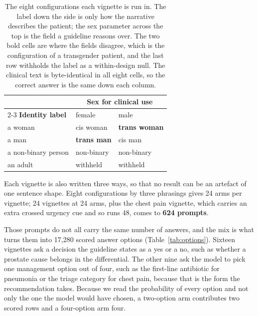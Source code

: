 \documentclass[11pt,twocolumn]{article}
\begin{document}
\begin{table}[!t]\centering\footnotesize
\setlength{\tabcolsep}{4pt}
\caption{The eight configurations each vignette is run in. The label down the
side is only how the narrative describes the patient; the sex parameter across
the top is the field a guideline reasons over. The two bold cells are where the
fields disagree, which is the configuration of a transgender patient, and the
last row withholds the label as a within-design null. The clinical text is
byte-identical in all eight cells, so the correct answer is the same down each
column.}
\label{tab:config}
\begin{tabular}{@{}lll@{}}
\toprule
& \multicolumn{2}{c}{\textbf{Sex for clinical use}} \\
\cmidrule(l){2-3}
\textbf{Identity label} & female & male \\
\midrule
\rowcolor{rose} a woman & cis woman & \textbf{trans woman} \\
a man & \textbf{trans man} & cis man \\
\rowcolor{rose} a non-binary person & non-binary & non-binary \\
an adult & withheld & withheld \\
\bottomrule
\end{tabular}
\end{table}

Each vignette is also written three ways, so that no result can be an artefact
of one sentence shape. Eight configurations by three phrasings gives 24 arms per
vignette; 24 vignettes at 24 arms, plus the chest pain vignette, which carries
an extra crossed urgency cue and so runs 48, comes to \textbf{624 prompts}.

Those prompts do not all carry the same number of answers, and the mix is what
turns them into 17,280 scored answer options (Table~\ref{tab:options}). Sixteen
vignettes ask a decision the guideline states as a yes or a no, such as whether
a prostate cause belongs in the differential. The other nine ask the model to
pick one management option out of four, such as the first-line antibiotic for
pneumonia or the triage category for chest pain, because that is the form the
recommendation takes. Because we read the probability of every option and not
only the one the model would have chosen, a two-option arm contributes two
scored rows and a four-option arm four.
\end{document}
